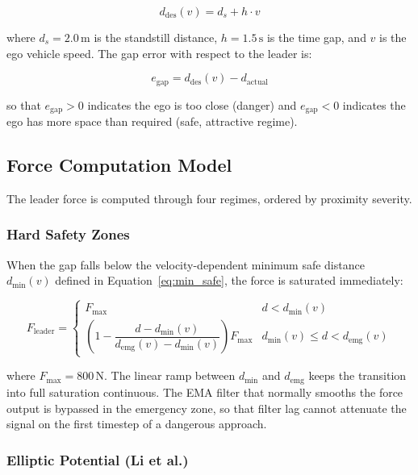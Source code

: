 \documentclass[12pt,a4paper,oneside]{report}
\begin{document}
\begin{equation}
d_{\mathrm{des}}(v) = d_s + h \cdot v
\label{eq:desired_gap}
\end{equation}

where $d_s = 2.0\,\mathrm{m}$ is the standstill distance, $h = 1.5\,\mathrm{s}$ is the time gap, and $v$ is the ego vehicle speed. The gap error with respect to the leader is:

\begin{equation}
e_{\mathrm{gap}} = d_{\mathrm{des}}(v) - d_{\mathrm{actual}}
\label{eq:gap_error}
\end{equation}

so that $e_{\mathrm{gap}} > 0$ indicates the ego is too close (danger) and $e_{\mathrm{gap}} < 0$ indicates the ego has more space than required (safe, attractive regime).

\subsection{Force Computation Model}
\label{sec:long_force}

The leader force is computed through four regimes, ordered by proximity severity.

\subsubsection{Hard Safety Zones}

When the gap falls below the velocity-dependent minimum safe distance $d_{\min}(v)$ defined in Equation~\ref{eq:min_safe}, the force is saturated immediately:

\begin{equation}
F_{\mathrm{leader}} = \begin{cases}
F_{\max} & d < d_{\min}(v) \\[4pt]
\left(1 - \dfrac{d - d_{\min}(v)}{d_{\mathrm{emg}}(v) - d_{\min}(v)}\right) F_{\max} & d_{\min}(v) \leq d < d_{\mathrm{emg}}(v)
\end{cases}
\label{eq:hard_zones}
\end{equation}

where $F_{\max} = 800\,\mathrm{N}$. The linear ramp between $d_{\min}$ and $d_{\mathrm{emg}}$ keeps the transition into full saturation continuous. The EMA filter that normally smooths the force output is bypassed in the emergency zone, so that filter lag cannot attenuate the signal on the first timestep of a dangerous approach.

\subsubsection{Elliptic Potential (Li et al.)}
\end{document}
